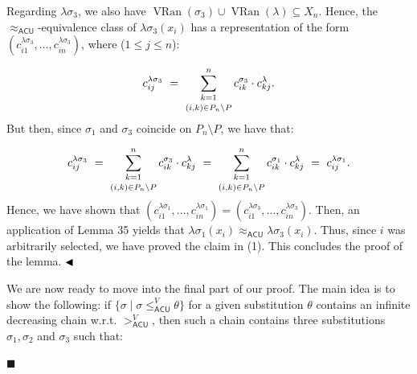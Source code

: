  
Regarding $\lambda\sigma_{3}$, we also have $\operatorname{VRan}(\sigma_{3})\cup\operatorname{VRan}(\lambda)\subseteq X_{n}$. Hence, the $\approx_{\mathsf{ACU}}$-equivalence class of $\lambda\sigma_{3}(x_{i})$ has a representation of the form $(c^{\lambda\sigma_{3}}_{i1},\ldots,c^{\lambda\sigma_{3}}_{in})$, where ($1\leq j\leq n$):\par
    \[c^{\lambda\sigma_{3}}_{ij}\ =\ \sum_{\begin{subarray}{c}k=1\\[2.45836pt]
(i,k)\in P_{n}\setminus P\end{subarray}}^{n}c^{\sigma_{3}}_{ik}\cdot c^{%
\lambda}_{kj}.\]    
But then, since $\sigma_{1}$ and $\sigma_{3}$ coincide on $P_{n}\setminus P$, we have that:\par
    \[c^{\lambda\sigma_{3}}_{ij}\ =\ \sum_{\begin{subarray}{c}k=1\\[2.45836pt]
(i,k)\in P_{n}\setminus P\end{subarray}}^{n}c^{\sigma_{3}}_{ik}\cdot c^{%
\lambda}_{kj}\ =\ \sum_{\begin{subarray}{c}k=1\\[2.45836pt]
(i,k)\in P_{n}\setminus P\end{subarray}}^{n}c^{\sigma_{1}}_{ik}\cdot c^{%
\lambda}_{kj}\ =\ c^{\lambda\sigma_{1}}_{ij}.\]    
Hence, we have shown that $(c^{\lambda\sigma_{1}}_{i1},\ldots,c^{\lambda\sigma_{1}}_{in})=(c^{\lambda%
\sigma_{3}}_{i1},\ldots,c^{\lambda\sigma_{3}}_{in})$. Then, an application of Lemma 35 yields that $\lambda\sigma_{1}(x_{i})\approx_{\mathsf{ACU}}\lambda\sigma_{3}(x_{i})$. Thus, since $i$ was arbitrarily selected, we have proved the claim in (1). This concludes the proof of the lemma. $\hfill\blacktriangleleft$\par
 
 
 
We are now ready to move into the final part of our proof. The main idea is to show the following: if $\{\sigma\mid\sigma\leq_{\mathsf{ACU}}^{V}\theta\}$ for a given substitution $\theta$ contains an infinite decreasing chain w.r.t. $>_{\mathsf{ACU}}^{V}$, then such a chain contains three substitutions $\sigma_{1},\sigma_{2}$ and $\sigma_{3}$ such that:\par
  
\par\noindent  $\blacksquare$ 
 
